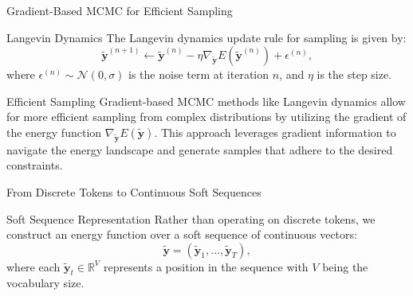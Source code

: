 \documentclass{beamer}
\begin{document}
\begin{frame}{Gradient-Based MCMC for Efficient Sampling}
    \begin{block}{Langevin Dynamics}
        The Langevin dynamics update rule for sampling is given by:
        \begin{equation}
            \tilde{\boldsymbol{y}}^{(n+1)} \leftarrow \tilde{\boldsymbol{y}}^{(n)} - \eta \nabla_{\tilde{\boldsymbol{y}}} E(\tilde{\boldsymbol{y}}^{(n)}) + \epsilon^{(n)},
        \end{equation}
        where $\epsilon^{(n)} \sim \mathcal{N}(0, \sigma)$ is the noise term at iteration $n$, and $\eta$ is the step size.
    \end{block}

    \begin{block}{Efficient Sampling}
        Gradient-based MCMC methods like Langevin dynamics allow for more efficient sampling from complex distributions by utilizing the gradient of the energy function $\nabla_{\tilde{\boldsymbol{y}}} E(\tilde{\boldsymbol{y}})$. This approach leverages gradient information to navigate the energy landscape and generate samples that adhere to the desired constraints.
    \end{block}
\end{frame}


\begin{frame}{From Discrete Tokens to Continuous Soft Sequences}
    \begin{block}{Soft Sequence Representation}
        Rather than operating on discrete tokens, we construct an energy function over a soft sequence of continuous vectors:
        \[
            \tilde{\boldsymbol{y}} = (\tilde{\boldsymbol{y}}_1, \ldots, \tilde{\boldsymbol{y}}_T),
        \]
        where each $\tilde{\boldsymbol{y}}_t \in \mathbb{R}^V$ represents a position in the sequence with $V$ being the vocabulary size.
    \end{block}

\end{frame}
\end{document}
